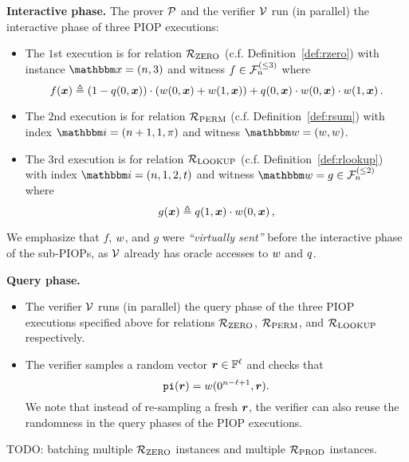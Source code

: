 \textbf{Interactive phase.} 
The prover $\mathcal{P}$ and the verifier $\mathcal{V}$ run (in parallel) the interactive phase 
of three PIOP executions:
        \begin{itemize}
            \item The $1$st execution is for relation ${\mathcal{R}}_{\text{ZERO}}$ (c.f. Definition~\ref{def:rzero}) 
                with instance $\instR = (n, 3)$ and witness $f \in {\mathcal{F}}_{n}^{(\le{3})}$ where
                \[
                    f(\boldsymbol{x}) \mathrel{\triangleq} (1-q(0, \boldsymbol{x}))\cdot (w(0, \boldsymbol{x}) + w(1, \boldsymbol{x})) 
                               + q(0, \boldsymbol{x}) \cdot w(0, \boldsymbol{x}) \cdot w(1, \boldsymbol{x})\,.
                \]
            \item The $2$nd execution is for relation ${\mathcal{R}}_{\text{PERM}}$ (c.f. Definition~\ref{def:rsum})
                with index $\idxR = (n+1, 1, \perm)$ and witness $\witR = (\witp, \witp)$.
            \item The $3$rd execution is for relation ${\mathcal{R}}_{\text{LOOKUP}}$ (c.f. Definition~\ref{def:rlookup})
                with index $\idxR = (n, 1, 2, \tabp)$ and witness $\witR = g \in \bdp{n}{2}$ where 
                \[
                    g(\boldsymbol{x}) \mathrel{\triangleq} q(1, \boldsymbol{x}) \cdot w(0, \boldsymbol{x}) \,,
                \]
        \end{itemize}
        We emphasize that $f$, $w$, and $g$ were \emph{``virtually sent''} before the interactive
        phase of the sub-PIOPs, as $\mathcal{V}$ already has oracle accesses to $w$ and $q$.

\textbf{Query phase.}
\begin{itemize}
    \item The verifier $\mathcal{V}$ runs (in parallel) the query phase of the three PIOP 
    executions specified above for relations ${\mathcal{R}}_{\text{ZERO}}$, ${\mathcal{R}}_{\text{PERM}}$, and ${\mathcal{R}}_{\text{LOOKUP}}$ respectively.
    \item The verifier samples a random vector $\boldsymbol{r} \in \mathbb{F}^{\ell}$ and checks that
        \[
            \mathtt{pi}(\boldsymbol{r}) = w(0^{n-\ell+1}, \boldsymbol{r}).
        \]
        We note that instead of re-sampling a fresh $\boldsymbol{r}$, the verifier can also reuse the randomness
        in the query phases of the PIOP executions.
\end{itemize}

\begin{remark}
    TODO: batching multiple ${\mathcal{R}}_{\text{ZERO}}$ instances and multiple ${\mathcal{R}}_{\text{PROD}}$ instances.
\end{remark}

